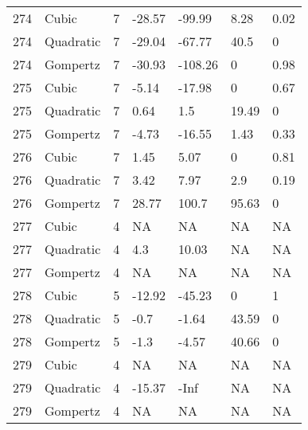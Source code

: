 \documentclass[11pt]{article}
\begin{document}
\begin{center}
\begin{longtable}{lllllll}
    274 & Cubic     & 7               & -28.57  & -99.99  & 8.28    & 0.02 \\
    274 & Quadratic & 7               & -29.04  & -67.77  & 40.5    & 0    \\
    274 & Gompertz  & 7               & -30.93  & -108.26 & 0       & 0.98 \\
    275 & Cubic     & 7               & -5.14   & -17.98  & 0       & 0.67 \\
    275 & Quadratic & 7               & 0.64    & 1.5     & 19.49   & 0    \\
    275 & Gompertz  & 7               & -4.73   & -16.55  & 1.43    & 0.33 \\
    276 & Cubic     & 7               & 1.45    & 5.07    & 0       & 0.81 \\
    276 & Quadratic & 7               & 3.42    & 7.97    & 2.9     & 0.19 \\
    276 & Gompertz  & 7               & 28.77   & 100.7   & 95.63   & 0    \\
    277 & Cubic     & 4               & NA      & NA      & NA      & NA   \\
    277 & Quadratic & 4               & 4.3     & 10.03   & NA      & NA   \\
    277 & Gompertz  & 4               & NA      & NA      & NA      & NA   \\
    278 & Cubic     & 5               & -12.92  & -45.23  & 0       & 1    \\
    278 & Quadratic & 5               & -0.7    & -1.64   & 43.59   & 0    \\
    278 & Gompertz  & 5               & -1.3    & -4.57   & 40.66   & 0    \\
    279 & Cubic     & 4               & NA      & NA      & NA      & NA   \\
    279 & Quadratic & 4               & -15.37  & -Inf    & NA      & NA   \\
    279 & Gompertz  & 4               & NA      & NA      & NA      & NA  
    \end{longtable}
    \end{center}
\end{document}
